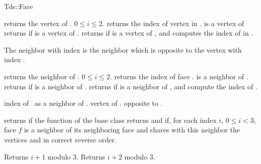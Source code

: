 \begin{ccClass}{Tds::Face}


{returns  the vertex  of \ccVar.
\ccPrecond $0\leq i \leq 2$.}
\ccGlue
{}
{returns the index of vertex  in \ccVar. \ccPrecond {} is
a vertex of \ccVar}
\ccGlue
{}
{returns  if   is a vertex of \ccVar.}
\ccGlue
{}
{returns  if   is a vertex of \ccVar, and
 computes the index  of  in .}




The neighbor with index  is the neighbor which is opposite
to the vertex with index .


{returns  the neighbor  of \ccVar. 
\ccPrecond $0\leq i \leq 2$.
}
\ccGlue
{}
{returns the index of face .
\ccPrecond {} is a neighbor of \ccVar.}
\ccGlue
{}
{returns  if  is a neighbor of \ccVar.}
\ccGlue
{}
{returns  if  is a neighbor of \ccVar,  and
compute the index  of .}

{index of \ccVar\ as a neighbor of \ccVar.}
\ccGlue
{}
{vertex of \ccVar. opposite to  \ccVar.}






{returns  if  the function 
 of the base class
returns  and if, for each index $i$, $0 \le i < 3$,
face $f$ is a neighbor of its neighboring face 
and shares with this neighbor the  vertices  and 
in correct reverse order.}

{Returns $i+1$ modulo 3.}
\ccGlue
{}
{Returns $i+2$ modulo 3.}

\end{ccClass}

